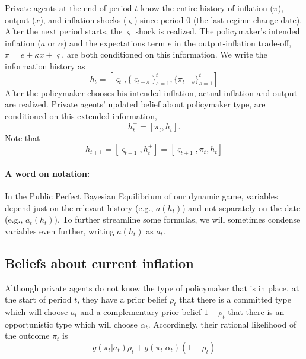 \documentclass[12pt,letter,leqno]{article}
\theoremstyle{asn}
\theoremstyle{lem}
\theoremstyle{slem}
\theoremstyle{prop}
\theoremstyle{appprop}
\theoremstyle{rem}
\theoremstyle{defn}
\begin{document}
Private agents at the end of period $t$ know the entire history of inflation ($\pi $), output ($x$), and inflation shocks ($\varsigma $) since period 0 (the last regime change date). After the
next period starts, the $\varsigma $ shock is realized. The policymaker's intended inflation ($a$ or $\alpha$) and the expectations term $e$ in the output-inflation trade-off, $\pi = e + \kappa x + \varsigma$, are both conditioned on this information. We write
the information history as 
\begin{equation*}
h_{t}=[\varsigma _{t},\{\varsigma _{t-s}\}_{s=1}^t,\{\pi
_{t-s}\}_{s=1}^t]
\end{equation*}
After the policymaker chooses his intended inflation, actual inflation and
output are realized. Private agents' updated belief about policymaker type, are conditioned on this extended information,  
\begin{equation*}
h_{t}^{+}=[\pi _{t},h_{t}].
\end{equation*}%
Note that 
\begin{equation*}
h_{t+1}=[\varsigma _{t+1},h_{t}^{+}]=[\varsigma _{t+1},\pi _{t},h_{t}]
\end{equation*}

\paragraph{A word on notation:} In the Public Perfect Bayesian Equilibrium of our 
dynamic game, variables depend just on the relevant history (e.g., $a(h_{t})$) and not separately on the date (e.g., $a_{t}(h_{t})$). To further streamline some formulas, we will sometimes condense variables even further, writing $a(h_{t})$ as $a_{t}$.

\subsection{Beliefs about current inflation}\label{appsec:recursive3}

Although private agents do not know the type of policymaker that is in
place, at the start of period $t$, they have a prior belief $\rho _{t}$ that
there is a committed type which will choose $a_{t}$ and a complementary prior
belief $1-\rho _{t}$ that there is an opportunistic type which will choose $%
\alpha _{t}$. Accordingly, their rational likelihood of the outcome $\pi _{t}
$ is
\begin{equation}
g(\pi _{t}|a_{t})\rho _{t}+g(\pi _{t}|\alpha _{t})(1-\rho _{t})
\label{pub prob pi}
\end{equation}
\end{document}
